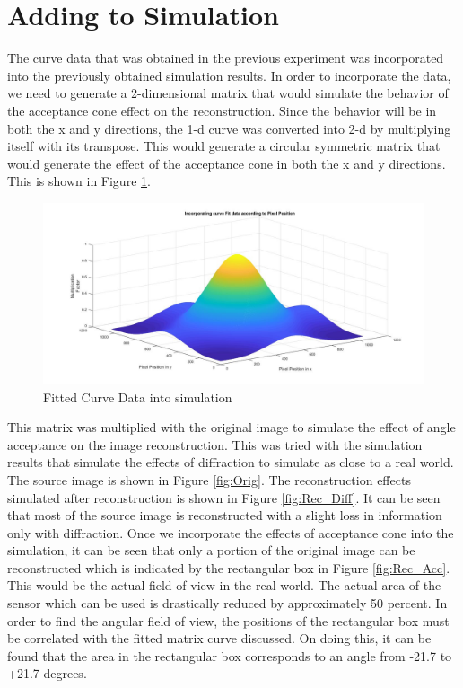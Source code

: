 \section{Adding to Simulation}
The curve data that was obtained in the previous experiment was incorporated into the previously obtained simulation results. In order to incorporate the data, we need to generate a 2-dimensional matrix that would simulate the behavior of the acceptance cone effect on the reconstruction. Since the behavior will be in both the x and y directions, the 1-d curve was converted into 2-d by multiplying itself with its transpose. This would generate a circular symmetric matrix that would generate the effect of the acceptance cone in both the x and y directions. This is shown in Figure \ref{fig:curve_sim}.
\begin{figure}[!h]
\centering
\includegraphics[width = \linewidth]{pics/AcceptanceConeCurveFit.jpg}
\caption{Fitted Curve Data into simulation}
\label{fig:curve_sim}
\end{figure}
This matrix was multiplied with the original image to simulate the effect of angle acceptance on the image reconstruction. This was tried with the simulation results that simulate the effects of diffraction to simulate as close to a real world. The source image is shown in Figure \ref{fig:Orig}. The reconstruction effects simulated after reconstruction is shown in Figure \ref{fig:Rec_Diff}. It can be seen that most of the source image is reconstructed with a slight loss in information only with diffraction. Once we incorporate the effects of acceptance cone into the simulation, it can be seen that only a portion of the original image can be reconstructed which is indicated by the rectangular box in Figure \ref{fig:Rec_Acc}. 
This would be the actual field of view in the real world. The actual area of the sensor which can be used is drastically reduced by approximately 50 percent. In order to find the angular field of view, the positions of the rectangular box must be correlated with the fitted matrix curve discussed. On doing this, it can be found that the area in the rectangular box corresponds to an angle from -21.7 to +21.7 degrees.

